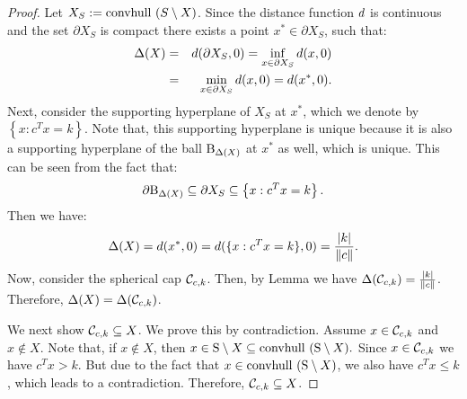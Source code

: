 \begin{proof} Let $X_S := \mbox{convhull }(S \setminus X)$.
Since the distance function $d$ is continuous and the set $\partial X_S$ is compact there exists a point $x^* \in \partial X_S$, such that:
\begin{eqnarray}\nonumber \Delta(X) &=& d(\partial X_S, 0) = \inf_{x \in \partial X_S}d(x, 0) \\
\label{deltaSupporting}&=& \min_{x \in \partial X_S}d(x, 0) = d(x^*, 0).\end{eqnarray} 
Next, consider the supporting hyperplane of $X_S$ at $x^*$, which we denote by $\left\{x : c^Tx = k\right\}$. Note that, this supporting hyperplane is unique because it is also a supporting hyperplane of the ball $\text{B}_{\Delta(X)}$ at $x^*$ as well, which is unique. This can be seen from the fact that:
\begin{equation*} \partial \text{B}_{\Delta(X)} \subseteq \partial X_S \subseteq \left\{x : c^Tx = k\right\}.\end{equation*}
Then we have:
\begin{equation*}\Delta(X) =  d(x^*, 0) = d(\{x : c^Tx = k\}, 0) = \frac{|k|}{\|c\|}.
\end{equation*}
Now, consider the spherical cap $\mathcal{C}_{c,k}$. Then, by Lemma \label{lemma:delta2} we have
$\Delta(\mathcal{C}_{c,k}) = \frac{|k|}{\|c\|}$. Therefore, $\Delta(X) = \Delta(\mathcal{C}_{c,k})$.


We next show $\mathcal{C}_{c, k} \subseteq X$. We prove this by contradiction. Assume $x \in \mathcal{C}_{c,k}$ and $x \notin X$. Note that, if $x \notin X$, then $x \in \text{S} \setminus X \subseteq \mbox{convhull }(\text{S} \setminus X).$ Since $x \in \mathcal{C}_{c,k}$ we have $c^Tx>k$. But due to the fact that $x \in \mbox{convhull }(\text{S} \setminus X)$, we also have $c^Tx \leq k$, which leads to a contradiction. Therefore, $\mathcal{C}_{c, k} \subseteq X$. 
\end{proof}



